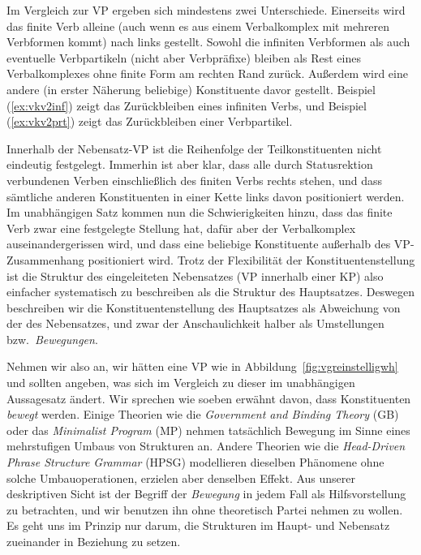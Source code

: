 Im Vergleich zur VP ergeben sich mindestens zwei Unterschiede.
Einerseits wird das finite Verb alleine (auch wenn es aus einem Verbalkomplex mit mehreren Verbformen kommt) nach links gestellt.
Sowohl die infiniten Verbformen als auch eventuelle Verbpartikeln (nicht aber Verbpräfixe) bleiben als Rest eines Verbalkomplexes ohne finite Form am rechten Rand zurück.
Außerdem wird eine andere (in erster Näherung beliebige) Konstituente davor gestellt.
Beispiel (\ref{ex:vkv2inf}) zeigt das Zurückbleiben eines infiniten Verbs, und Beispiel (\ref{ex:vkv2prt}) zeigt das Zurückbleiben einer Verbpartikel.

\begin{exe}
  \ex\label{ex:vkv2inf}
  \begin{xlist}
  \end{xlist}
  \ex\label{ex:vkv2prt}
  \begin{xlist}
  \end{xlist}
\end{exe}


Innerhalb der Nebensatz-VP ist die Reihenfolge der Teilkonstituenten nicht eindeutig festgelegt.
Immerhin ist aber klar, dass alle durch Statusrektion verbundenen Verben einschließlich des finiten Verbs rechts stehen, und dass sämtliche anderen Konstituenten in einer Kette links davon positioniert werden.  
Im unabhängigen Satz kommen nun die Schwierigkeiten hinzu, dass das finite Verb zwar eine festgelegte Stellung hat, dafür aber der Verbalkomplex auseinandergerissen wird, und dass eine beliebige Konstituente außerhalb des VP-Zusammenhang positioniert wird.
Trotz der Flexibilität der Konstituentenstellung ist die Struktur des eingeleiteten Nebensatzes (VP innerhalb einer KP) also einfacher systematisch zu beschreiben als die Struktur des Hauptsatzes.
Deswegen beschreiben wir die Konstituentenstellung des Hauptsatzes als Abweichung von der des Nebensatzes, und zwar der Anschaulichkeit halber als Umstellungen bzw.\ \textit{Bewegungen}.

Nehmen wir also an, wir hätten eine VP wie in Abbildung~\ref{fig:vgreinstelligwh} und sollten angeben, was sich im Vergleich zu dieser im unabhängigen Aussagesatz ändert.
Wir sprechen wie soeben erwähnt davon, dass Konstituenten \textit{bewegt} werden.
Einige Theorien wie \zB die \textit{Government and Binding Theory} (GB) oder das \textit{Minimalist Program} (MP) nehmen tatsächlich Bewegung im Sinne eines mehrstufigen Umbaus von Strukturen an.
Andere Theorien wie die \textit{Head-Driven Phrase Structure Grammar} (HPSG) modellieren dieselben Phänomene ohne solche Umbauoperationen, erzielen aber denselben Effekt.
Aus unserer deskriptiven Sicht ist der Begriff der \textit{Bewegung} in jedem Fall als Hilfsvorstellung zu betrachten, und wir benutzen ihn ohne theoretisch Partei nehmen zu wollen.
Es geht uns im Prinzip nur darum, die Strukturen im Haupt- und Nebensatz zueinander in Beziehung zu setzen.

